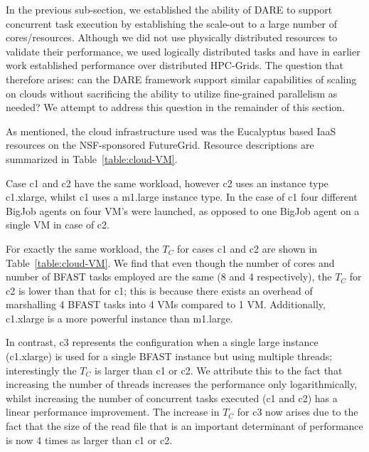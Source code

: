 \documentclass{acm_proc_article-sp}
\begin{document}
In the previous sub-section, we established the ability of DARE to
support concurrent task execution by establishing the scale-out to a
large number of cores/resources. Although we did not use physically
distributed resources to validate their performance, we used logically
distributed tasks and have in earlier work established performance
over distributed HPC-Grids\cite{saga-ccgrid10}.  The question that
therefore arises: can the DARE framework support similar capabilities
of scaling on clouds without sacrificing the ability to utilize
fine-grained parallelism as needed? We attempt to address this
question in the remainder of this section.

As mentioned, the cloud infrastructure used was the Eucalyptus based
IaaS resources on the NSF-sponsored FutureGrid\cite{futuregrid}.
Resource descriptions are summarized in Table~\ref{table:cloud-VM}.

Case c1 and c2 have the same workload, however c2 uses an instance
type c1.xlarge, whilst c1 uses a m1.large instance type.  In the case
of c1 four different BigJob agents on four VM's were launched, as
opposed to one BigJob agent on a single VM in case of c2.

For exactly the same workload, the $T_C$ for cases c1 and c2 are shown
in Table~\ref{table:cloud-VM}. We find that even though the number of
cores and number of BFAST tasks employed are the same (8 and 4
respectively), the $T_C$ for c2 is lower than that for c1; this is
because there exists an overhead of marshalling 4 BFAST tasks into 4
VMs compared to 1 VM.  Additionally, c1.xlarge is a more powerful
instance than m1.large. 

In contrast, c3 represents the configuration when a single large
instance (c1.xlarge) is used for a single BFAST instance but using
multiple threads; interestingly the $T_C$ is larger than c1 or c2.  We
attribute this to the fact that increasing the number of threads
increases the performance only logarithmically, whilst increasing the
number of concurrent tasks executed (c1 and c2) has a linear
performance improvement. The increase in $T_C$ for c3 now arises
due to the fact that the size of the read file that is
an important determinant of performance is now 4 times as larger
than c1 or c2.


\end{document}
